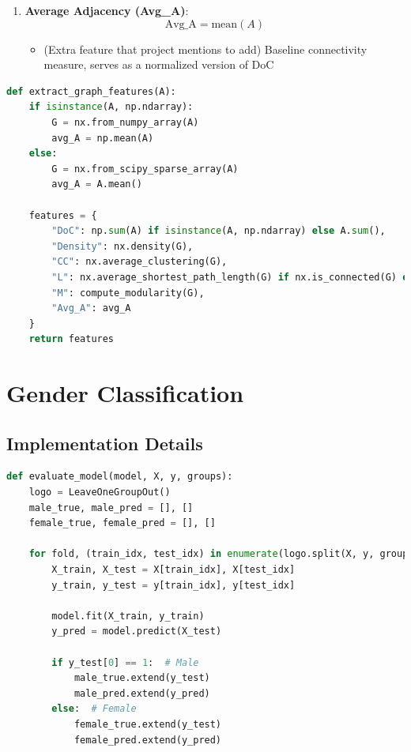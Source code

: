 \documentclass[12pt]{ieeetj}
\begin{document}
\begin{enumerate}
    \item \textbf{Average Adjacency (Avg\_A)}:
    \begin{equation}
        \text{Avg\_A} = \text{mean}(A)
    \end{equation}
    \begin{itemize}
	    \item (Extra feature that project mentions to add) Baseline connectivity measure, serves as a normalized version of DoC
    \end{itemize}
\end{enumerate}




\begin{lstlisting}[language=Python]
def extract_graph_features(A):
    if isinstance(A, np.ndarray):
        G = nx.from_numpy_array(A)
        avg_A = np.mean(A)
    else:
        G = nx.from_scipy_sparse_array(A)
        avg_A = A.mean()
        
    features = {
        "DoC": np.sum(A) if isinstance(A, np.ndarray) else A.sum(),
        "Density": nx.density(G),
        "CC": nx.average_clustering(G),
        "L": nx.average_shortest_path_length(G) if nx.is_connected(G) else np.nan,
        "M": compute_modularity(G),
        "Avg_A": avg_A  
    }
    return features
\end{lstlisting}

\section{Gender Classification}
\subsection{Implementation Details}
\begin{lstlisting}[language=Python]
def evaluate_model(model, X, y, groups):
    logo = LeaveOneGroupOut()
    male_true, male_pred = [], []
    female_true, female_pred = [], []
    
    for fold, (train_idx, test_idx) in enumerate(logo.split(X, y, groups)):
        X_train, X_test = X[train_idx], X[test_idx]
        y_train, y_test = y[train_idx], y[test_idx]
        
        model.fit(X_train, y_train)
        y_pred = model.predict(X_test)
        
        if y_test[0] == 1:  # Male
            male_true.extend(y_test)
            male_pred.extend(y_pred)
        else:  # Female
            female_true.extend(y_test)
            female_pred.extend(y_pred)
\end{lstlisting}
\end{document}

